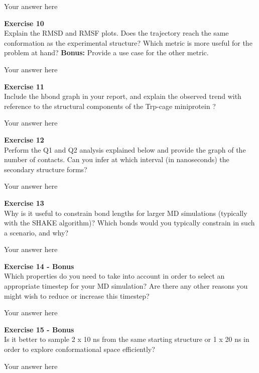 \documentclass{article}
\begin{document}
Your answer here

\begin{mdframed}
\textbf{Exercise 10}\\
Explain the RMSD and RMSF plots.  Does the trajectory reach the same conformation as the experimental structure?
Which metric is more useful for the problem at hand? \textbf{Bonus:}  Provide a use case for the other metric.
\end{mdframed}

Your answer here

\begin{mdframed}
\textbf{Exercise 11}\\
Include the hbond graph in your report, and explain the observed trend with reference to the structural components of the Trp-cage miniprotein ?
\end{mdframed}

Your answer here

\begin{mdframed}
\textbf{Exercise 12}\\
Perform the Q1 and Q2 analysis explained below and provide the graph of the number of contacts. Can you infer at which interval (in nanoseconds) the secondary structure forms?
\end{mdframed}

Your answer here

\begin{mdframed}
\textbf{Exercise 13}\\
Why is it useful to constrain bond lengths for larger MD simulations (typically with the SHAKE algorithm)? Which bonds would you typically constrain in such a scenario, and why?
\end{mdframed}

Your answer here

\begin{mdframed}
\textbf{Exercise 14 - Bonus}\\
Which properties do you need to take into account in order to select an appropriate timestep for your MD simulation? Are there any other reasons you might wish to reduce or increase this timestep?
\end{mdframed}

Your answer here

\begin{mdframed}
\textbf{Exercise 15 - Bonus}\\
Is it better to sample 2 x 10 ns from the same starting structure or 1 x 20 ns in order to explore conformational space efficiently?
\end{mdframed}

Your answer here
\end{document}
